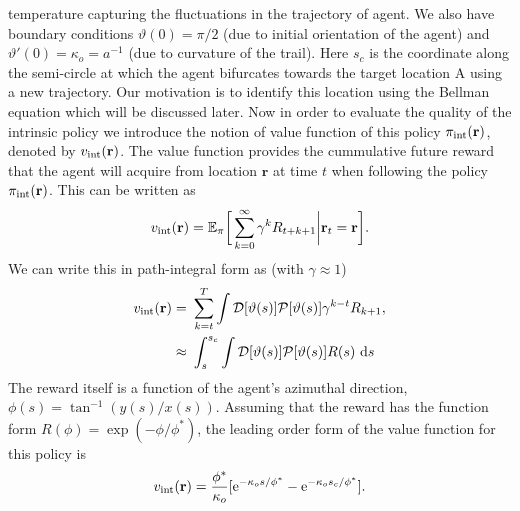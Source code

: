 \documentclass[%
reprint,
superscriptaddress,
floatfix,
amsmath,
amssymb,
aps,
notitlepage
]{revtex4-1}
\def\d{\text{d}}
\def\e{\text{e}}
\def\r{\mathbf{r}}
\def\E{\mathbb{E}}
\def\P{\mathcal{P}}
\def\D{\mathcal{D}}
\def\theta{\vartheta}
\begin{document}
temperature capturing the fluctuations in the trajectory of agent. We also have
boundary conditions $\theta(0) = \pi/2$ (due to initial orientation of the agent) and $\theta'(0) = \kappa_o = a^{-1}$ (due to curvature of the trail).
Here $s_c$ is the coordinate along the semi-circle at which the agent bifurcates towards the target location A using a new trajectory.
Our motivation is to identify this location using the Bellman equation which will be discussed later.
Now in order to evaluate the quality of the intrinsic policy we introduce the notion of value function
of this policy $\pi_{\rm int}(\r)$, denoted by $v_{\rm int}(\r)$. The value function provides the cummulative
future reward that the agent will acquire from location $\r$ at time $t$
when following the policy $\pi_{\rm int}(\r)$. This can be written as
\[
    v_{\rm int}(\r) = \E_\pi \bigg[ \sum_{k=0}^\infty \gamma^k R_{t+k+1} \bigg| \r_t = \r \bigg].
\]
We can write this in path-integral form as (with $\gamma \approx 1$)
\begin{align}
    v_{\rm int}(\r) =& \ \sum_{k=t}^T \int \D[\theta(s)] \P[\theta(s)] \gamma^{k-t} R_{k+1}, \\
    \approx& \ \int_{s}^{s_c} \int \D[\theta(s)] \P[\theta(s)] R(s) \ \d s
\end{align}
The reward itself is a function of the agent's azimuthal direction, $\phi(s) = \tan^{-1}(y(s)/x(s))$.
Assuming that the reward has the function form $R(\phi) = \exp(-\phi/\phi^*)$, the leading order form of 
the value function for this policy is
\[
    v_{\rm int}(\r) = \frac{\phi^*}{\kappa_o} [ \e^{-\kappa_o s/\phi^*} - \e^{-\kappa_o s_c/\phi^*}].
\]
\end{document}
